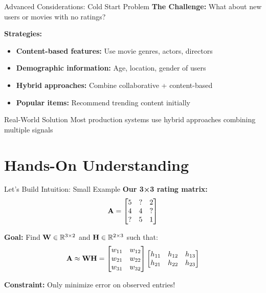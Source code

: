 \documentclass{beamer}
\begin{document}
\begin{frame}{Advanced Considerations: Cold Start Problem}
\textbf{The Challenge:} What about new users or movies with no ratings?

\pause
\textbf{Strategies:}
\begin{itemize}[<+->]
    \item \textbf{Content-based features:} Use movie genres, actors, directors
    \item \textbf{Demographic information:} Age, location, gender of users
    \item \textbf{Hybrid approaches:} Combine collaborative + content-based
    \item \textbf{Popular items:} Recommend trending content initially
\end{itemize}

\pause
\begin{alertbox}{Real-World Solution}
Most production systems use hybrid approaches combining multiple signals
\end{alertbox}
\end{frame}

\section{Hands-On Understanding}

\begin{frame}{Let's Build Intuition: Small Example}
\textbf{Our 3×3 rating matrix:}
\begin{equation*}
\mathbf{A} = \begin{bmatrix}
5 & ? & 2 \\
4 & 4 & ? \\
? & 5 & 1
\end{bmatrix}
\end{equation*}

\pause
\textbf{Goal:} Find $\mathbf{W} \in \mathbb{R}^{3 \times 2}$ and $\mathbf{H} \in \mathbb{R}^{2 \times 3}$ such that:
\begin{equation*}
\mathbf{A} \approx \mathbf{W} \mathbf{H} = \begin{bmatrix}
w_{11} & w_{12} \\
w_{21} & w_{22} \\
w_{31} & w_{32}
\end{bmatrix}
\begin{bmatrix}
h_{11} & h_{12} & h_{13} \\
h_{21} & h_{22} & h_{23}
\end{bmatrix}
\end{equation*}

\pause
\textbf{Constraint:} Only minimize error on observed entries!
\end{frame}
\end{document}

